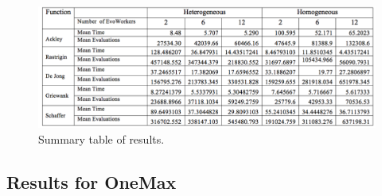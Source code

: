 \documentclass{llncs}
\begin{document}
\begin{figure}[t]
    \centering
        \includegraphics[width=4.5in]{img/table.png}
    \caption{Summary table of results. }
    \label{fig:summary}
\end{figure}

\subsection{Results for OneMax}
\end{document}

